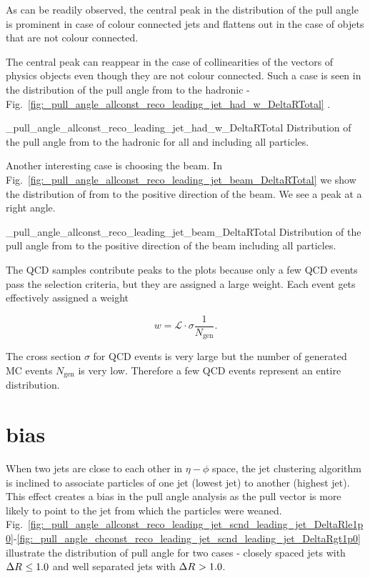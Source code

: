 As can be readily observed, the central peak in the distribution of the pull angle is prominent in case of colour connected jets and flattens out in the case of objets that are not colour connected.

The central peak can reappear in the case of collinearities of the vectors of physics objects even though they are not colour connected. Such a case is seen in the distribution of the pull angle from \leadingjet to the hadronic \PW - Fig.~\ref{fig:_pull_angle_allconst_reco_leading_jet_had_w_DeltaRTotal}
. 

          {_pull_angle_allconst_reco_leading_jet_had_w_DeltaRTotal}
          {Distribution of the pull angle from \leadingjet to the hadronic \PW for all \DeltaR and including all particles.}

Another interesting case is choosing the beam. In Fig.~\ref{fig:_pull_angle_allconst_reco_leading_jet_beam_DeltaRTotal} we show the distribution of \pullangle from \leadingjet to the positive direction of the beam. We see a peak at a right angle.

          {_pull_angle_allconst_reco_leading_jet_beam_DeltaRTotal}
          {Distribution of the pull angle from \leadingjet to the positive direction of the beam including all particles.}

The QCD samples contribute peaks to the plots because only a few QCD events pass the selection criteria, but they are assigned a large weight. Each event gets effectively assigned a weight

\begin{equation}
w=\mathcal{L}\cdot\sigma\frac{1}{N_{\text{gen}}}.
\end{equation}

The cross section $\sigma$ for QCD events is very large but the number of generated MC events $N_{\text{gen}}$ is very low. Therefore a few QCD events represent an entire distribution.

\section{\DeltaR bias}

When two jets are close to each other in $\eta-\phi$ space, the jet clustering algorithm is inclined to associate particles of one jet (lowest \pt jet) to another (highest \pt jet). This effect creates a bias in the pull angle analysis as the pull vector is more likely to point to the jet from which the particles were weaned. Fig.~\ref{fig:_pull_angle_allconst_reco_leading_jet_scnd_leading_jet_DeltaRle1p0}-\ref{fig:_pull_angle_chconst_reco_leading_jet_scnd_leading_jet_DeltaRgt1p0} illustrate the distribution of pull angle for two cases - closely spaced jets with $\Delta R^{}\leq1.0$ and well separated jets with $\Delta R^{}>1.0$.

